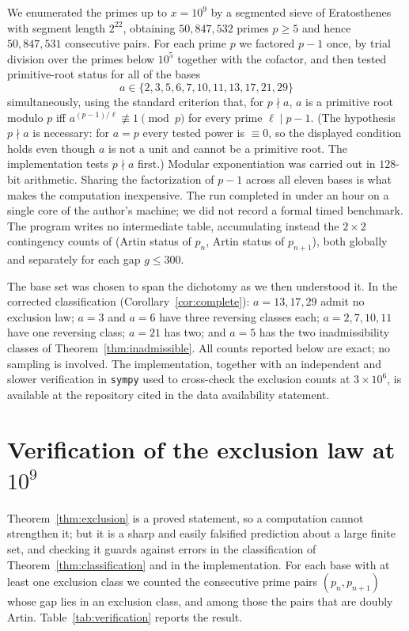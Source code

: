 \documentclass[11pt,reqno]{amsart}
\theoremstyle{plain}
\theoremstyle{definition}
\begin{document}
We enumerated the primes up to $x = 10^9$ by a segmented sieve of Eratosthenes
with segment length $2^{22}$, obtaining $50{,}847{,}532$ primes $p \ge 5$ and
hence $50{,}847{,}531$ consecutive pairs. For each prime $p$ we factored
$p - 1$ once, by trial division over the primes below $10^5$ together with the
cofactor, and then tested primitive-root status for all of the bases
\[
  a \in \{2, 3, 5, 6, 7, 10, 11, 13, 17, 21, 29\}
\]
simultaneously, using the standard criterion that, for $p \nmid a$, $a$ is a
primitive root modulo $p$ iff $a^{(p-1)/\ell} \not\equiv 1 \pmod p$ for every
prime $\ell \mid p-1$. (The hypothesis $p \nmid a$ is necessary: for $a = p$ every tested power is
$\equiv 0$, so the displayed condition holds even though $a$ is not a unit and
cannot be a primitive root. The implementation tests $p \nmid a$ first.) Modular exponentiation was carried out in $128$-bit
arithmetic. Sharing the factorization of $p-1$ across all eleven bases is what
makes the computation inexpensive. The run completed in under an hour on a
single core of the author's machine; we did not record a formal timed
benchmark. The program writes no intermediate table, accumulating instead the
$2\times 2$ contingency counts of (Artin status of $p_n$, Artin status of
$p_{n+1}$), both globally and separately for each gap $g \le 300$.

The base set was chosen to span the dichotomy as we then understood it. In
the corrected classification (Corollary~\ref{cor:complete}): $a = 13, 17, 29$
admit no exclusion law; $a = 3$ and $a = 6$ have three reversing classes each;
$a = 2, 7, 10, 11$ have one reversing class; $a = 21$ has two; and $a = 5$ has
the two inadmissibility classes of Theorem~\ref{thm:inadmissible}. All counts
reported below are exact; no sampling is involved. The implementation,
together with an independent and slower verification in \texttt{sympy} used to
cross-check the exclusion counts at $3 \times 10^6$, is available at the
repository cited in the data availability statement.

\section{Verification of the exclusion law at \texorpdfstring{$10^9$}{10^9}}
\label{sec:verification}

Theorem~\ref{thm:exclusion} is a proved statement, so a computation cannot
strengthen it; but it is a sharp and easily falsified prediction about a large
finite set, and checking it guards against errors in the classification of
Theorem~\ref{thm:classification} and in the implementation. For each base with
at least one exclusion class we counted the consecutive prime pairs
$(p_n, p_{n+1})$ whose gap lies in an exclusion class, and among those the pairs
that are doubly Artin. Table~\ref{tab:verification} reports the result.
\end{document}
